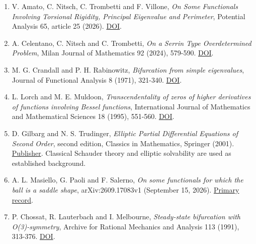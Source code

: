 \documentclass[11pt]{article}
\providecommand{\tightlist}{\setlength{\itemsep}{0pt}\setlength{\parskip}{0pt}}
\begin{document}
\begin{enumerate}
\def\labelenumi{\arabic{enumi}.}
\tightlist
\item
  V. Amato, C. Nitsch, C. Trombetti and F. Villone, \emph{On Some
  Functionals Involving Torsional Rigidity, Principal Eigenvalue and
  Perimeter}, Potential Analysis 65, article 25 (2026).
  \href{https://doi.org/10.1007/s11118-026-10328-2}{DOI}.
\item
  A. Celentano, C. Nitsch and C. Trombetti, \emph{On a Serrin Type
  Overdetermined Problem}, Milan Journal of Mathematics 92 (2024),
  579-590. \href{https://doi.org/10.1007/s00032-024-00405-9}{DOI}.
\item
  M. G. Crandall and P. H. Rabinowitz, \emph{Bifurcation from simple
  eigenvalues}, Journal of Functional Analysis 8 (1971), 321-340.
  \href{https://doi.org/10.1016/0022-1236(71)90015-2}{DOI}.
\item
  L. Lorch and M. E. Muldoon, \emph{Transcendentality of zeros of higher
  derivatives of functions involving Bessel functions}, International
  Journal of Mathematics and Mathematical Sciences 18 (1995), 551-560.
  \href{https://doi.org/10.1155/S0161171295000706}{DOI}.
\item
  D. Gilbarg and N. S. Trudinger, \emph{Elliptic Partial Differential
  Equations of Second Order}, second edition, Classics in Mathematics,
  Springer (2001).
  \href{https://doi.org/10.1007/978-3-642-61798-0}{Publisher}. Classical
  Schauder theory and elliptic solvability are used as established
  background.
\item
  A. L. Masiello, G. Paoli and F. Salerno, \emph{On some functionals for
  which the ball is a saddle shape}, arXiv:2609.17083v1 (September 15,
  2026). \href{https://arxiv.org/abs/2609.17083}{Primary record}.
\item
  P. Chossat, R. Lauterbach and I. Melbourne, \emph{Steady-state
  bifurcation with O(3)-symmetry}, Archive for Rational Mechanics and
  Analysis 113 (1991), 313-376.
  \href{https://doi.org/10.1007/BF00374697}{DOI}.
\end{enumerate}
\end{document}
